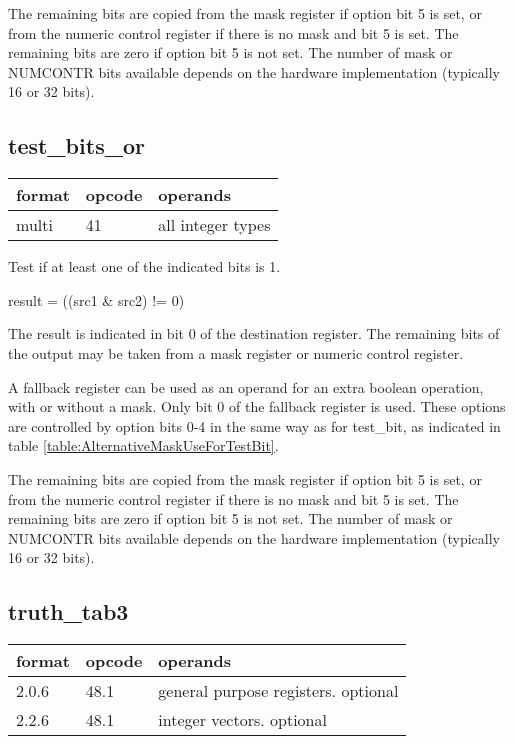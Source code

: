 \documentclass[forwardcom.tex]{subfiles}
\begin{document}
The remaining bits are copied from the mask register if option bit 5 is set, or from the numeric control register if there is no mask and bit 5 is set. The remaining bits are zero if option bit 5 is not set. The number of mask or NUMCONTR bits available depends on the hardware implementation (typically 16 or 32 bits).
\vv


\subsection{test\_bits\_or}
\label{table:testBitsOrInstruction}
\begin{tabular}{|p{12mm}|p{15mm}|p{100mm}|}
\hline
\bfseries format & \bfseries opcode & \bfseries operands \\ \hline
multi & 41 & all integer types \\ \hline
\end{tabular}
\vv

Test if at least one of the indicated bits is 1.

result = ((src1 \& src2) != 0)
\vv

The result is indicated in bit 0 of the destination register. 
The remaining bits of the output may be taken from a mask register or numeric control register. 
\vv

A fallback register can be used as an operand for an extra boolean operation, with or without a mask. Only bit 0 of the fallback register is used. These options are controlled by option bits 0-4 in the same way as for test\_bit, as indicated in table \ref{table:AlternativeMaskUseForTestBit}.
\vv

The remaining bits are copied from the mask register if option bit 5 is set, or from the numeric control register if there is no mask and bit 5 is set. The remaining bits are zero if option bit 5 is not set. The number of mask or NUMCONTR bits available depends on the hardware implementation (typically 16 or 32 bits).
\vv


\subsection{truth\_tab3}
\label{table:truthTab3Instruction}
\begin{tabular}{|p{12mm}|p{15mm}|p{100mm}|}
\hline
\bfseries format & \bfseries opcode & \bfseries operands \\ \hline
2.0.6 & 48.1 & general purpose registers. optional \\ \hline
2.2.6 & 48.1 & integer vectors. optional \\ \hline
\end{tabular}
\vv
\end{document}
